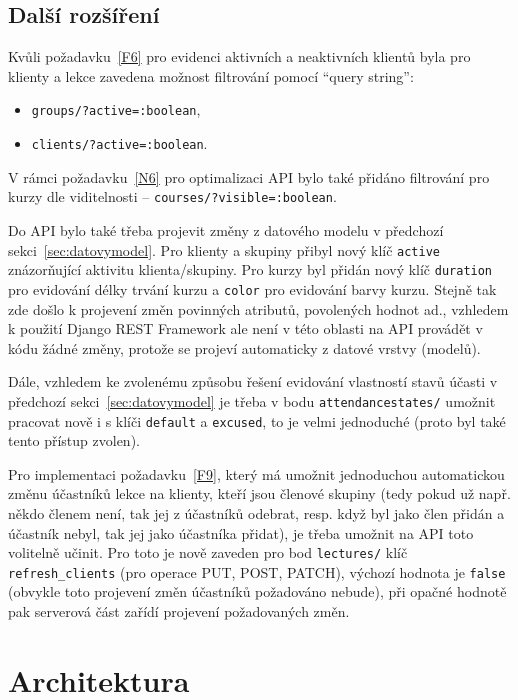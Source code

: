 \subsection{Další rozšíření}

Kvůli požadavku~\ref{F6} pro evidenci aktivních a neaktivních klientů byla pro klienty a lekce zavedena možnost filtrování pomocí \enquote{query string}:
\begin{itemize}
    \item \verb|groups/?active=:boolean|,
    \item \verb|clients/?active=:boolean|.
\end{itemize}

V rámci požadavku~\ref{N6} pro optimalizaci API bylo také přidáno filtrování pro kurzy dle viditelnosti -- \verb|courses/?visible=:boolean|.

Do API bylo také třeba projevit změny z datového modelu v předchozí sekci~\ref{sec:datovymodel}. Pro klienty a skupiny přibyl nový klíč \verb|active| znázorňující aktivitu klienta/skupiny. Pro kurzy byl přidán nový klíč \verb|duration| pro evidování délky trvání kurzu a \verb|color| pro evidování barvy kurzu. Stejně tak zde došlo k projevení změn povinných atributů, povolených hodnot ad., vzhledem k použití Django REST Framework ale není v této oblasti na API provádět v kódu žádné změny, protože se projeví automaticky z datové vrstvy (modelů).

Dále, vzhledem ke zvolenému způsobu řešení evidování vlastností stavů účasti v předchozí sekci~\ref{sec:datovymodel} je třeba v bodu \verb|attendancestates/| umožnit pracovat nově i s klíči \verb|default| a \verb|excused|, to je velmi jednoduché (proto byl také tento přístup zvolen).

Pro implementaci požadavku~\ref{F9}, který má umožnit jednoduchou automatickou změnu účastníků lekce na klienty, kteří jsou členové skupiny (tedy pokud už např. někdo členem není, tak jej z účastníků odebrat, resp. když byl jako člen přidán a účastník nebyl, tak jej jako účastníka přidat), je třeba umožnit na API toto volitelně učinit. Pro toto je nově zaveden pro bod \verb|lectures/| klíč \verb|refresh_clients| (pro operace PUT, POST, PATCH), výchozí hodnota je \verb|false| (obvykle toto projevení změn účastníků požadováno nebude), při opačné hodnotě pak serverová část zařídí projevení požadovaných změn. 

\section{Architektura}

